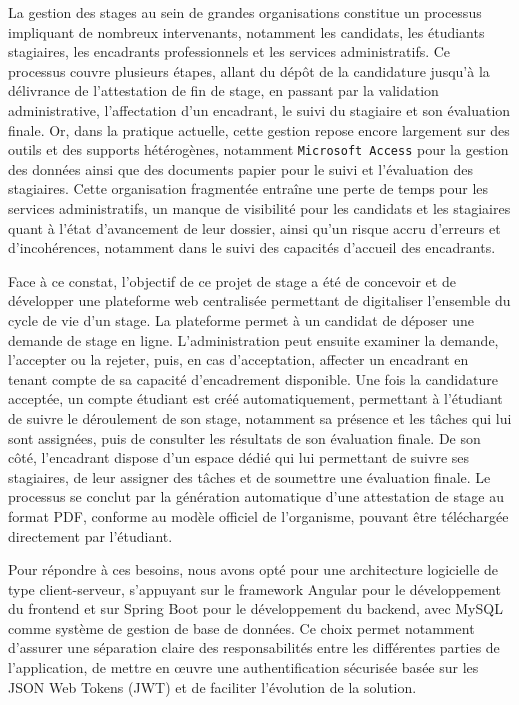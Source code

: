 \documentclass[14pt,a4paper]{article}
\begin{document}
La gestion des stages au sein de grandes organisations constitue un processus impliquant de nombreux intervenants, notamment les candidats, les étudiants stagiaires, les encadrants professionnels et les services administratifs. Ce processus couvre plusieurs étapes, allant du dépôt de la candidature jusqu'à la délivrance de l'attestation de fin de stage, en passant par la validation administrative, l'affectation d'un encadrant, le suivi du stagiaire et son évaluation finale. Or, dans la pratique actuelle, cette gestion repose encore largement sur des outils et des supports hétérogènes, notamment \texttt{Microsoft Access} pour la gestion des données ainsi que des documents papier pour le suivi et l'évaluation des stagiaires. Cette organisation fragmentée entraîne une perte de temps pour les services administratifs, un manque de visibilité pour les candidats et les stagiaires quant à l'état d'avancement de leur dossier, ainsi qu'un risque accru d'erreurs et d'incohérences, notamment dans le suivi des capacités d'accueil des encadrants.

Face à ce constat, l'objectif de ce projet de stage a été de concevoir et de développer une plateforme web centralisée permettant de digitaliser l'ensemble du cycle de vie d'un stage. La plateforme permet à un candidat de déposer une demande de stage en ligne. L'administration peut ensuite examiner la demande, l'accepter ou la rejeter, puis, en cas d'acceptation, affecter un encadrant en tenant compte de sa capacité d'encadrement disponible. Une fois la candidature acceptée, un compte étudiant est créé automatiquement, permettant à l'étudiant de suivre le déroulement de son stage, notamment sa présence et les tâches qui lui sont assignées, puis de consulter les résultats de son évaluation finale. De son côté, l'encadrant dispose d'un espace dédié qui lui permettant de suivre ses stagiaires, de leur assigner des tâches et de soumettre une évaluation finale. Le processus se conclut par la génération automatique d'une attestation de stage au format PDF, conforme au modèle officiel de l'organisme, pouvant être téléchargée directement par l'étudiant.

Pour répondre à ces besoins, nous avons opté pour une architecture logicielle de type client-serveur, s'appuyant sur le framework Angular pour le développement du frontend et sur Spring Boot pour le développement du backend, avec MySQL comme système de gestion de base de données. Ce choix permet notamment d'assurer une séparation claire des responsabilités entre les différentes parties de l'application, de mettre en œuvre une authentification sécurisée basée sur les JSON Web Tokens (JWT) et de faciliter l'évolution de la solution.
\end{document}

